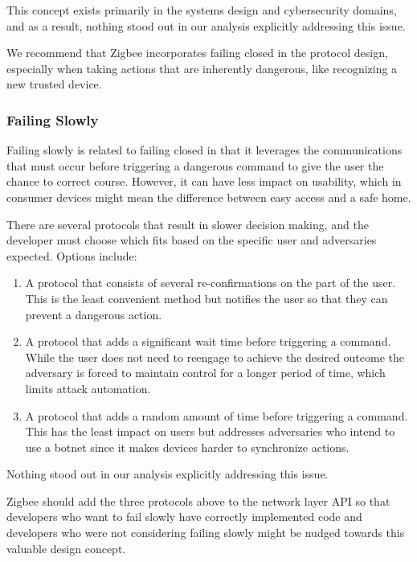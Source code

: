 This concept exists primarily in the systems design and cybersecurity domains, and as a result, nothing stood out in our analysis explicitly addressing this issue.

 We recommend that Zigbee incorporates failing closed in the protocol design, especially when taking actions that are inherently dangerous, like recognizing a new trusted device. 

\subsubsection{Failing Slowly}
Failing slowly is related to failing closed in that it leverages the communications that must occur before triggering a dangerous command to give the user the chance to correct course. However, it can have less impact on usability, which in consumer devices might mean the difference between easy access and a safe home.


 There are several protocols that result in slower decision making, and the developer must choose which fits based on the specific user and adversaries expected. Options include:
\begin{enumerate}
\item A protocol that consists of several re-confirmations on the part of the user. This is the least convenient method but notifies the user so that they can prevent a dangerous action.
\item A protocol that adds a significant wait time before triggering a command. While the user does not need to reengage to achieve the desired outcome the adversary is forced to maintain control for a longer period of time, which limits attack automation.
\item A protocol that adds a random amount of time before triggering a command. This has the least impact on users but addresses adversaries who intend to use a botnet since it makes devices harder to synchronize actions.
\end{enumerate}


 Nothing stood out in our analysis explicitly addressing this issue.


Zigbee should add the three protocols above to the network layer API so that developers who want to fail slowly have correctly implemented code and developers who were not considering failing slowly might be nudged towards this valuable design concept.

